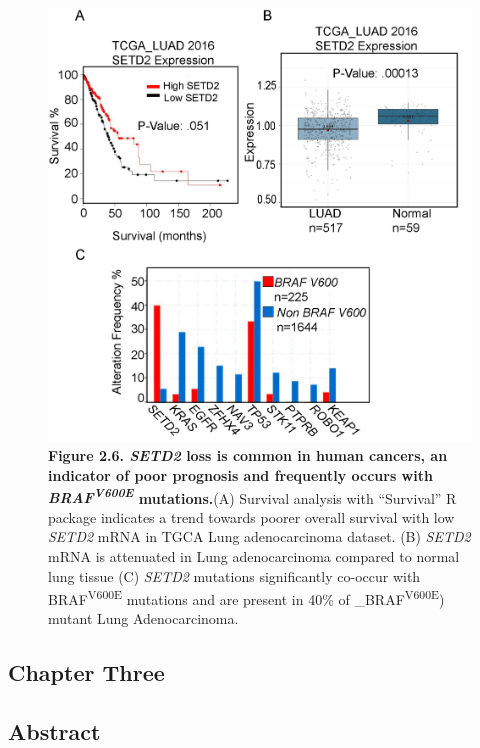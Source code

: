 \begin{figure}
\hypertarget{fig:09}{%
\centering
\includegraphics[width=1\textwidth,height=\textheight]{images/tuba6.png}
\caption{\textbf{Figure 2.6. \emph{SETD2} loss is common in human cancers, an indicator of poor prognosis and frequently occurs with \emph{BRAF\textsuperscript{V600E}} mutations.}(A) Survival analysis with ``Survival'' R package indicates a trend towards poorer overall survival with low \emph{SETD2} mRNA in TGCA Lung adenocarcinoma dataset. (B) \emph{SETD2} mRNA is attenuated in Lung adenocarcinoma compared to normal lung tissue (C) \emph{SETD2} mutations significantly co-occur with BRAF\textsuperscript{V600E} mutations and are present in 40\% of \_BRAF\textsuperscript{V600E}) mutant Lung Adenocarcinoma.}\label{fig:09}
}
\end{figure}

\hypertarget{chapter-three}{%
\subsection{Chapter Three}\label{chapter-three}}

\hypertarget{abstract-1}{%
\subsection{Abstract}\label{abstract-1}}

